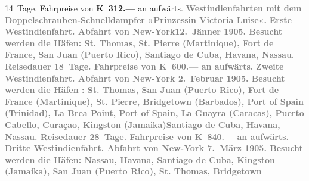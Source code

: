 \begin{ledgroupsized}[t]{13cm}
{{                  14 Tage. Fahrpreise von \textbf{K 312.—} an aufwärts.}}\pend
           {\bigskip}\pstart
           \noindent{}\centering{}\textcolor{gray}{\textbf{Westindienfahrten mit dem Doppelschrauben-Schnelldampfer
                  »Prinzessin Victoria Luise«.}}\pend
           \pstart
           \noindent{}\textcolor{gray}{\textbf{\textbf{Erste Westindienfahrt.} Abfahrt von New-York\textbf{12. Jänner 1905}. Besucht werden die Häfen: St. Thomas,
                     St. Pierre (Martinique), Fort de France, San Juan
                     (Puerto Rico), Santiago de Cuba, Havana, Nassau. Reisedauer 18 Tage. Fahrpreise von \textbf{K 600.—}
                  an aufwärts.}}\pend
           \pstart
           \textcolor{gray}{\textbf{\textbf{Zweite Westindienfahrt.} Abfahrt von New-York { }\textbf{2. Februar 1905}. Besucht werden die Häfen : St. Thomas,
                     San Juan (Puerto Rico), Fort de France (Martinique), St. Pierre, Bridgetown (Barbados), Port of Spain (Trinidad), La Brea Point, Port of
                     Spain, La Guayra (Caracas), Puerto Cabello, Curaçao, Kingston (Jamaika)Santiago de Cuba, Havana, Nassau. Reisedauer 28 Tage.
                  Fahrpreise von \textbf{K 840.—} an aufwärts.}}\pend
           \pstart
           \textcolor{gray}{\textbf{\textbf{Dritte Westindienfahrt.} Abfahrt von New-York { }\textbf{7. März 1905}. Besucht werden die Häfen: Nassau, Havana, Santiago
                     de Cuba, Kingston (Jamaika), San Juan (Puerto Rico), St. Thomas, Bridgetown
}}
\end{ledgroupsized}

